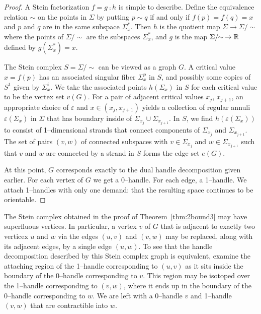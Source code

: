 \begin{proof}
	A Stein factorization $f=g\comp h$ is simple to describe.
	Define the equivalence relation $\sim$ on the points in $\Sigma$ by putting $p\sim q$ if and only if $f(p)=f(q)=x$ and $p$ and $q$ are in the same subspace $\Sigma_x^*$.
	Then $h$ is the quotient map $\Sigma\to \Sigma/\!\!\sim$ where the points of $\Sigma/\!\!\sim$ are the subspaces $\Sigma_x^*$, and $g$ is the map $\Sigma/\!\!\sim\, \to\mathbb{R}$ defined by $g(\Sigma_x^*)=x$.

	The Stein complex $S=\Sigma/\!\!\sim$ can be viewed as a graph $G$.
	A critical value $x=f(p)$ has an associated singular fiber $\Sigma_x^p$ in $S$, and possibly some copies of $S^1$ given by $\Sigma_x^i$.
	We take the associated points $h(\Sigma_x)$ in $S$ for each critical value to be the vertex set $v(G)$.
	For a pair of adjacent critical values $x_{j}$, $x_{j+1}$, an appropriate choice of $\varepsilon$ and $x\in(x_{j},x_{j+1})$ yields a collection of regular annuli $\varepsilon(\Sigma_x)$ in $\Sigma$ that has boundary inside of $\Sigma_{x_{j}}\cup\Sigma_{x_{j+1}}$.
	In $S$, we find $h(\varepsilon(\Sigma_x))$ to consist of 1--dimensional strands that connect components of $\Sigma_{x_{j}}$ and $\Sigma_{x_{j+1}}$.
	The set of pairs $(v,w)$ of connected subspaces with $v\in\Sigma_{x_{j}}$ and $w\in\Sigma_{x_{j+1}}$ such that $v$ and $w$ are connected by a strand in $S$ forms the edge set $e(G)$.
	
	At this point, $G$ corresponds exactly to the dual handle decomposition given earlier.
	For each vertex of $G$ we get a 0--handle.
	For each edge, a 1--handle.
	We attach 1--handles with only one demand: that the resulting space continues to be orientable.
\end{proof}

The Stein complex obtained in the proof of Theorem~\ref{thm:2bound3} may have superfluous vertices.
In particular, a vertex $v$ of $G$ that is adjacent to exactly two verticex $u$ and $w$ via the edges $(u,v)$ and $(v,w)$ may be replaced, along with its adjacent edges, by a single edge $(u,w)$.
To see that the handle decomposition described by this Stein complex graph is equivalent, examine the attaching region of the 1--handle corresponding to $(u,v)$ as it sits inside the boundary of the 0--handle corresponding to $v$.
This region may be isotoped over the 1--handle corresponding to $(v,w)$, where it ends up in the boundary of the 0--handle corresponding to $w$.
We are left with a 0--handle $v$ and 1--handle $(v,w)$ that are contractible into $w$.